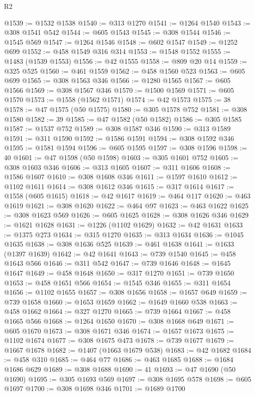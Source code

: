 \begin{lexlean}{R2}
\begin{coremodule}
@1539 := @1532 @1538
@1540 := @313 @1270
@1541 := @1264 @1540
@1543 := @308 @1541 @542
@1544 := @605 @1543
@1545 := @308 @1544
@1546 := @1545 @569
@1547 := @1264 @1546
@1548 := @602 @1547
@1549 := @1252 @699
@1552 := @458 @1549 @316 @314
@1553 := @1548 @1552
@1555 := @1483 (@1539 @1553)
@1556 := @42 @1555
@1558 := @809 @20 @14
@1559 := @325 @525
@1560 := @461 @1559
@1562 := @458 @1560 @523
@1563 := @605 @699
@1565 := @308 @1563 @346
@1566 := @1280 @1565
@1567 := @605 @1566
@1569 := @308 @1567 @346
@1570 := @1500 @1569
@1571 := @605 @1570
@1573 := @1558 (@1562 @1571)
@1574 := @42 @1573
@1575 := 38
@1578 := @47 @1575 (@50 @1575)
@1580 := @305 @1578 @752
@1581 := @308 @1580
@1582 := 39
@1585 := @47 @1582 (@50 @1582)
@1586 := @305 @1585
@1587 := @1537 @752
@1589 := @308 @1587 @346
@1590 := @313 @1589
@1591 := @311 @1590
@1592 := @1586 @1591
@1594 := @308 @1592 @346
@1595 := @1581 @1594
@1596 := @605 @1595
@1597 := @308 @1596
@1598 := 40
@1601 := @47 @1598 (@50 @1598)
@1603 := @305 @1601 @752
@1605 := @308 @1603 @346
@1606 := @313 @1605
@1607 := @311 @1606
@1608 := @1586 @1607
@1610 := @308 @1608 @346
@1611 := @1597 @1610
@1612 := @1102 @1611
@1614 := @308 @1612 @346
@1615 := @317 @1614
@1617 := @1558 (@605 @1615)
@1618 := @42 @1617
@1619 := @464 @117
@1620 := @463 @1619
@1621 := @308 @1620
@1622 := @464 @97
@1623 := @463 @1622
@1625 := @308 @1623 @569
@1626 := @605 @1625
@1628 := @308 @1626 @346
@1629 := @1621 @1628
@1631 := @1226 (@1102 @1629)
@1632 := @42 @1631
@1633 := @1375 @273
@1634 := @315 @1270
@1635 := @313 @1634
@1636 := @1045 @1635
@1638 := @308 @1636 @525
@1639 := @461 @1638
@1641 := @1633 (@1397 @1639)
@1642 := @42 @1641
@1643 := @739 @1540
@1645 := @458 @1643 @566
@1646 := @311 @542
@1647 := @739 @1646
@1648 := @1645 @1647
@1649 := @458 @1648
@1650 := @317 @1270
@1651 := @739 @1650
@1653 := @458 @1651 @566
@1654 := @1545 @346
@1655 := @311 @1654
@1656 := @1102 @1655
@1657 := @308 @1656
@1658 := @1657 @649
@1659 := @739 @1658
@1660 := @1653 @1659
@1662 := @1649 @1660 @538
@1663 := @458 @1662
@1664 := @327 @1270
@1665 := @739 @1664
@1667 := @458 @1665 @566
@1668 := @1264 @1650
@1670 := @308 @1668 @649
@1671 := @605 @1670
@1673 := @308 @1671 @346
@1674 := @1657 @1673
@1675 := @1102 @1674
@1677 := @308 @1675 @473
@1678 := @739 @1677
@1679 := @1667 @1678
@1682 := @1407 (@1663 @1679 @538)
@1683 := @42 @1682
@1684 := @458 @310
@1685 := @464 @77
@1686 := @463 @1685
@1688 := @1684 @1686 @629
@1689 := @308 @1688
@1690 := 41
@1693 := @47 @1690 (@50 @1690)
@1695 := @305 @1693 @569
@1697 := @308 @1695 @578
@1698 := @605 @1697
@1700 := @308 @1698 @346
@1701 := @1689 @1700

\end{coremodule}
\end{lexlean}
